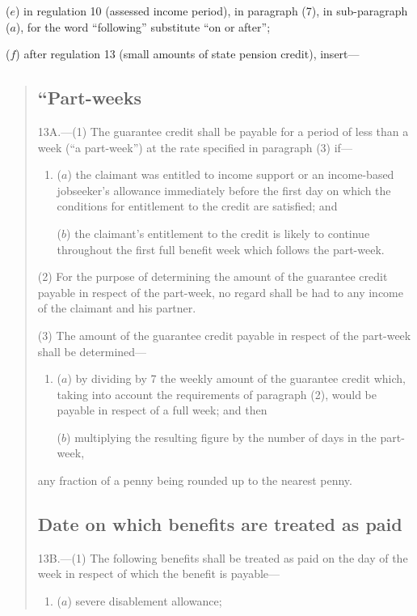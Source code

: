 \documentclass[12pt,a4paper]{article}
\begin{document}
\begin{enumerate}
($e$) in regulation 10 (assessed income period), in paragraph (7), in sub-paragraph ($a$), for the word “following” substitute “on or after”;

($f$) after regulation 13 (small amounts of state pension credit), insert—
\begin{quotation}
\subsection*{“Part-weeks}

13A.---(1)  The guarantee credit shall be payable for a period of less than a week (“a part-week”) at the rate specified in paragraph (3) if—
\begin{enumerate}\item[]
($a$) the claimant was entitled to income support or an income-based jobseeker’s allowance immediately before the first day on which the conditions for entitlement to the credit are satisfied; and

($b$) the claimant’s entitlement to the credit is likely to continue throughout the first full benefit week which follows the part-week.
\end{enumerate}

(2) For the purpose of determining the amount of the guarantee credit payable in respect of the part-week, no regard shall be had to any income of the claimant and his partner.

(3) The amount of the guarantee credit payable in respect of the part-week shall be determined—
\begin{enumerate}\item[]
($a$) by dividing by 7 the weekly amount of the guarantee credit which, taking into account the requirements of paragraph (2), would be payable in respect of a full week; and then

($b$) multiplying the resulting figure by the number of days in the part-week,
\end{enumerate}
any fraction of a penny being rounded up to the nearest penny.

\subsection*{Date on which benefits are treated as paid}

13B.---(1)  The following benefits shall be treated as paid on the day of the week in respect of which the benefit is payable—
\begin{enumerate}\item[]
($a$) severe disablement allowance;


\end{enumerate}
\end{quotation}
\end{enumerate}
\end{document}
